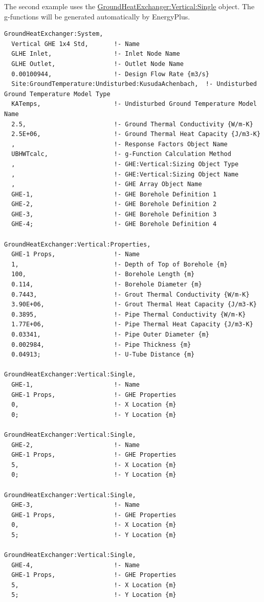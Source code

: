 The second example uses the \hyperref[groundheatexchangerverticalsingle]{GroundHeatExchanger:Vertical:Single} object.
The g-functions will be generated automatically by EnergyPlus.

\begin{lstlisting}
GroundHeatExchanger:System,
  Vertical GHE 1x4 Std,       !- Name
  GLHE Inlet,                 !- Inlet Node Name
  GLHE Outlet,                !- Outlet Node Name
  0.00100944,                 !- Design Flow Rate {m3/s}
  Site:GroundTemperature:Undisturbed:KusudaAchenbach,  !- Undisturbed Ground Temperature Model Type
  KATemps,                    !- Undisturbed Ground Temperature Model Name
  2.5,                        !- Ground Thermal Conductivity {W/m-K}
  2.5E+06,                    !- Ground Thermal Heat Capacity {J/m3-K}
  ,                           !- Response Factors Object Name
  UBHWTcalc,                  !- g-Function Calculation Method
  ,                           !- GHE:Vertical:Sizing Object Type
  ,                           !- GHE:Vertical:Sizing Object Name
  ,                           !- GHE Array Object Name
  GHE-1,                      !- GHE Borehole Definition 1
  GHE-2,                      !- GHE Borehole Definition 2
  GHE-3,                      !- GHE Borehole Definition 3
  GHE-4;                      !- GHE Borehole Definition 4

GroundHeatExchanger:Vertical:Properties,
  GHE-1 Props,                !- Name
  1,                          !- Depth of Top of Borehole {m}
  100,                        !- Borehole Length {m}
  0.114,                      !- Borehole Diameter {m}
  0.7443,                     !- Grout Thermal Conductivity {W/m-K}
  3.90E+06,                   !- Grout Thermal Heat Capacity {J/m3-K}
  0.3895,                     !- Pipe Thermal Conductivity {W/m-K}
  1.77E+06,                   !- Pipe Thermal Heat Capacity {J/m3-K}
  0.03341,                    !- Pipe Outer Diameter {m}
  0.002984,                   !- Pipe Thickness {m}
  0.04913;                    !- U-Tube Distance {m}

GroundHeatExchanger:Vertical:Single,
  GHE-1,                      !- Name
  GHE-1 Props,                !- GHE Properties
  0,                          !- X Location {m}
  0;                          !- Y Location {m}

GroundHeatExchanger:Vertical:Single,
  GHE-2,                      !- Name
  GHE-1 Props,                !- GHE Properties
  5,                          !- X Location {m}
  0;                          !- Y Location {m}

GroundHeatExchanger:Vertical:Single,
  GHE-3,                      !- Name
  GHE-1 Props,                !- GHE Properties
  0,                          !- X Location {m}
  5;                          !- Y Location {m}

GroundHeatExchanger:Vertical:Single,
  GHE-4,                      !- Name
  GHE-1 Props,                !- GHE Properties
  5,                          !- X Location {m}
  5;                          !- Y Location {m}
\end{lstlisting}

